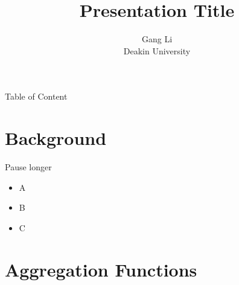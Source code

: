 \documentclass[
 size=12pt,
 paper=smartboard,  %
 mode=present, 		%
 display=slides, 	%
 style=tuliplab,  	%
 pauseslide,
 fleqn,leqno]{powerdot}
\title{Presentation Title}
\author{
Gang Li
\\
Deakin University 
}
\date{\gitCommitterDate}
\begin{document}
\maketitle 

\begin{slide}[toc=,bm=]{Table of Content}
 \tableofcontents[type=1,content=futuresections]
\end{slide}

\section{Background}

\begin{slide}{Pause longer}
\begin{itemize}
\item A \pause
\item B \pause[2]
\item C
\end{itemize}
\end{slide}


\section{Aggregation Functions}
\end{document}

